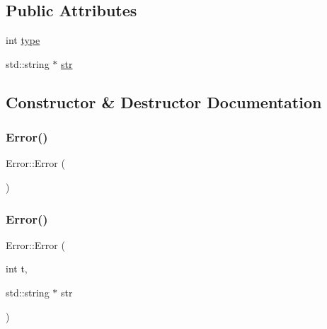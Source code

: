\subsection*{Public Attributes}
\begin{DoxyCompactItemize}
\item 
int \hyperlink{class_error_a87ec3b472513bcf651c0facbd9926c7c}{type}
\item 
std\+::string $\ast$ \hyperlink{class_error_adef2e029304986e6210e7f81f0dca074}{str}
\end{DoxyCompactItemize}


\subsection{Constructor \& Destructor Documentation}
\hypertarget{class_error_aca339d00ad8481fb4c184f0ece42698b}{}\label{class_error_aca339d00ad8481fb4c184f0ece42698b} 
\subsubsection{\texorpdfstring{Error()}{Error()}\hspace{0.1cm}{\footnotesize\ttfamily [1/2]}}
{\footnotesize\ttfamily Error\+::\+Error (\begin{DoxyParamCaption}{ }\end{DoxyParamCaption})\hspace{0.3cm}{\ttfamily [inline]}}

\hypertarget{class_error_a9e6a79d4d774de29af7a7ea7fe3f8c7b}{}\label{class_error_a9e6a79d4d774de29af7a7ea7fe3f8c7b} 
\subsubsection{\texorpdfstring{Error()}{Error()}\hspace{0.1cm}{\footnotesize\ttfamily [2/2]}}
{\footnotesize\ttfamily Error\+::\+Error (\begin{DoxyParamCaption}\item[{int}]{t,  }\item[{std\+::string $\ast$}]{str }\end{DoxyParamCaption})\hspace{0.3cm}{\ttfamily [inline]}}

\hypertarget{class_error_a1a45d42a3a035d510333cdfeb36a0e93}{}\label{class_error_a1a45d42a3a035d510333cdfeb36a0e93} 
